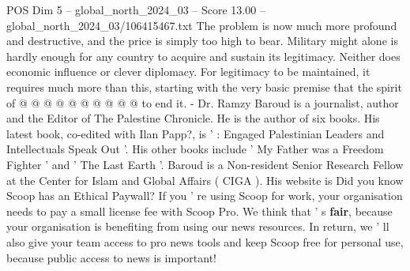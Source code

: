 \begin{textsample}{POS Dim 5 – global\_north\_2024\_03 – Score 13.00 – global\_north\_2024\_03/106415467.txt}
The problem is now much more profound and destructive, and the price is simply too high to bear.
Military might alone is hardly enough for any country to acquire and sustain its legitimacy.
Neither does economic influence or clever diplomacy.
For legitimacy to be maintained, it requires much more than this, starting with the very basic premise that the spirit of @ @ @ @ @ @ @ @ @ @ to end it. - Dr.
Ramzy Baroud is a journalist, author and the Editor of The Palestine Chronicle.
He is the author of six books.
His latest book, co-edited with Ilan Papp?, is ' : Engaged Palestinian Leaders and Intellectuals Speak Out '.
His other books include ' My Father was a Freedom Fighter ' and ' The Last Earth '.
Baroud is a Non-resident Senior Research Fellow at the Center for Islam and Global Affairs ( CIGA ).
His website is Did you know Scoop has an Ethical Paywall?
If you ' re using Scoop for work, your organisation needs to pay a small license fee with Scoop Pro.
We think that ' s \textbf{fair}, because your organisation is benefiting from using our news resources.
In return, we ' ll also give your team access to pro news tools and keep Scoop free for personal use, because public access to news is important!

\end{textsample}
